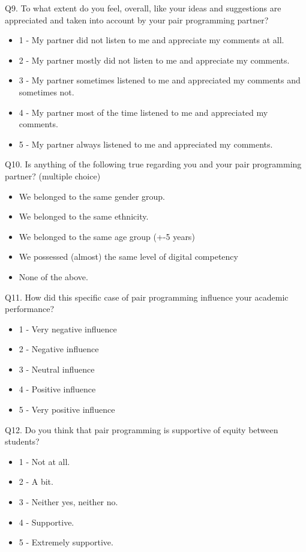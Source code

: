 \documentclass[conference]{IEEEtran}
\begin{document}
Q9. To what extent do you feel, overall, like your ideas and suggestions are appreciated and taken into account by your pair programming partner?
    \begin{itemize}
        \item 1 - My partner did not listen to me and appreciate my comments at all.
        \item 2 - My partner mostly did not listen to me and appreciate my comments.
        \item 3 - My partner sometimes listened to me and appreciated my comments and sometimes not.
        \item 4 - My partner most of the time listened to me and appreciated my comments.
        \item 5 - My partner always listened to me and appreciated my comments.
    \end{itemize}

Q10. Is anything of the following true regarding you and your pair programming partner? (multiple choice)
    \begin{itemize}
        \item We belonged to the same gender group.
        \item We belonged to the same ethnicity.
        \item We belonged to the same age group (+-5 years)
        \item We possessed (almost) the same level of digital competency
        \item None of the above.
    \end{itemize}
    
Q11. How did this specific case of pair programming influence your academic performance?
    \begin{itemize}
        \item 1 - Very negative influence
        \item 2 - Negative influence
        \item 3 - Neutral influence
        \item 4 - Positive influence
        \item 5 - Very positive influence
    \end{itemize}
    
Q12. Do you think that pair programming is supportive of equity between students?
    \begin{itemize}
        \item 1 - Not at all.
        \item 2 - A bit.
        \item 3 - Neither yes, neither no.
        \item 4 - Supportive.
        \item 5 - Extremely supportive.
    \end{itemize}
\end{document}

